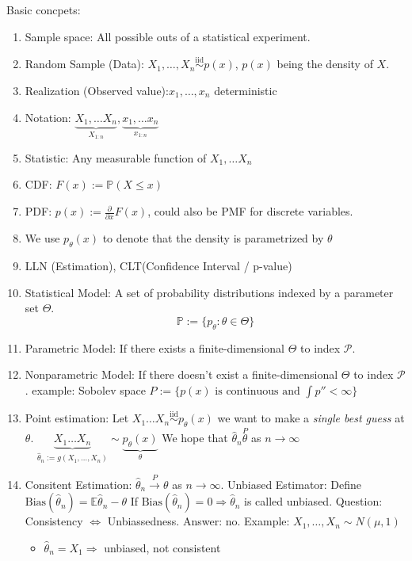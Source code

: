 \documentclass{article}
\begin{document}
Basic concpets:
\begin{enumerate}
\item Sample space: All possible outs of a statistical experiment.
\item Random Sample (Data): $X_1, \ldots, X_n \overset{\text{iid}}{\sim} p(x)$, $p(x)$ being the density of $X$.
\item Realization (Observed value):$x_1, \ldots, x_n$ deterministic
\item Notation: $\underbrace{X_1, \ldots X_n}_{X_{1:n}}, \underbrace{x_1, \ldots x_n}_{x_{1:n}}$
\item Statistic: Any measurable function of $X_1, \ldots X_n$
\item CDF: $F(x) := \mathbb P(X \le x)$
\item PDF: $p(x) := \frac{\partial}{\partial x}F(x)$, could also be PMF for discrete variables.
\item We use $p_{\theta}(x)$ to denote that the density is parametrized by $\theta$
\item LLN (Estimation), CLT(Confidence Interval / p-value)
\item Statistical Model: A set of probability distributions indexed by a parameter set $\Theta$.
  $$\mathbb P := \{ p_{\theta}: \theta \in \Theta \}$$
\item Parametric Model: If there exists a finite-dimensional $\Theta$ to index $\mathcal P$.
\item Nonparametric Model: If there doesn't  exist a finite-dimensional $\Theta$ to index $\mathcal P$.
  example: Sobolev space $P := \{ p(x) \text{ is continuous and } \int p'' < \infty \}$
\item Point estimation: Let $X_1 \ldots X_n \overset{\text{iid}}{\sim} p_{\theta}(x)$ we want to make a \textit{single best guess} at $\theta$.
  $\underbrace{X_1 \ldots X_n}_{\hat \theta_n := g(X_1, \ldots, X_n)} \sim \underbrace{p_{\theta}(x)}_{\theta}$
  We hope that $\hat \theta_n \overset{P} \theta$ as $n \rightarrow \infty$
\item
  Consitent Estimation: $\hat \theta_n \overset{P}{\rightarrow} \theta$ as $n \rightarrow \infty$.
  Unbiased Estimator: Define $\text{Bias}(\hat \theta_n)  = \mathbb E \hat \theta_n - \theta$
  If $\text{Bias}(\hat \theta_n) = 0 \Rightarrow \hat \theta_n$ is called unbiased.
  Question: Consistency $\iff$ Unbiassedness.
  Answer: no.
  Example: $X_1, \ldots, X_n \sim N(\mu, 1)$
  \begin{itemize}
  \item $\hat \theta_n = X_1 \Rightarrow $ unbiased, not consistent

\end{itemize}
\end{enumerate}
\end{document}
